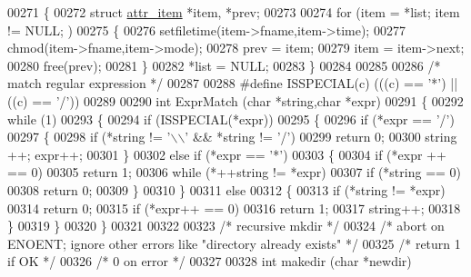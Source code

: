 \begin{DoxyCode}
{{{00271 \{
00272   \textcolor{keyword}{struct }\hyperlink{structattr__item}{attr\_item} *item, *prev;
00273 
00274   \textcolor{keywordflow}{for} (item = *list; item != NULL; )
00275     \{
00276       setfiletime(item->fname,item->time);
00277       chmod(item->fname,item->mode);
00278       prev = item;
00279       item = item->next;
00280       free(prev);
00281     \}
00282   *list = NULL;
00283 \}
00284 
00285 
00286 \textcolor{comment}{/* match regular expression */}
00287 
00288 \textcolor{preprocessor}{#define ISSPECIAL(c) (((c) == '*') || ((c) == '/'))}
00289 
00290 \textcolor{keywordtype}{int} ExprMatch (\textcolor{keywordtype}{char} *\textcolor{keywordtype}{string},\textcolor{keywordtype}{char} *expr)
00291 \{
00292   \textcolor{keywordflow}{while} (1)
00293     \{
00294       \textcolor{keywordflow}{if} (ISSPECIAL(*expr))
00295         \{
00296           \textcolor{keywordflow}{if} (*expr == \textcolor{charliteral}{'/'})
00297             \{
00298               \textcolor{keywordflow}{if} (*\textcolor{keywordtype}{string} != \textcolor{charliteral}{'\(\backslash\)\(\backslash\)'} && *\textcolor{keywordtype}{string} != \textcolor{charliteral}{'/'})
00299                 \textcolor{keywordflow}{return} 0;
00300               \textcolor{keywordtype}{string} ++; expr++;
00301             \}
00302           \textcolor{keywordflow}{else} \textcolor{keywordflow}{if} (*expr == \textcolor{charliteral}{'*'})
00303             \{
00304               \textcolor{keywordflow}{if} (*expr ++ == 0)
00305                 \textcolor{keywordflow}{return} 1;
00306               \textcolor{keywordflow}{while} (*++\textcolor{keywordtype}{string} != *expr)
00307                 \textcolor{keywordflow}{if} (*\textcolor{keywordtype}{string} == 0)
00308                   \textcolor{keywordflow}{return} 0;
00309             \}
00310         \}
00311       \textcolor{keywordflow}{else}
00312         \{
00313           \textcolor{keywordflow}{if} (*\textcolor{keywordtype}{string} != *expr)
00314             \textcolor{keywordflow}{return} 0;
00315           \textcolor{keywordflow}{if} (*expr++ == 0)
00316             \textcolor{keywordflow}{return} 1;
00317           \textcolor{keywordtype}{string}++;
00318         \}
00319     \}
00320 \}
00321 
00322 
00323 \textcolor{comment}{/* recursive mkdir */}
00324 \textcolor{comment}{/* abort on ENOENT; ignore other errors like "directory already exists" */}
00325 \textcolor{comment}{/* return 1 if OK */}
00326 \textcolor{comment}{/*        0 on error */}
00327 
00328 \textcolor{keywordtype}{int} makedir (\textcolor{keywordtype}{char} *newdir)
}}}
\end{DoxyCode}
